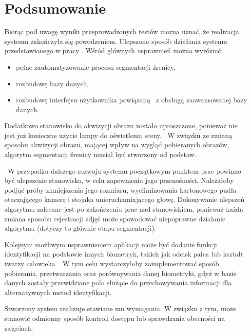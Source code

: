 \chapter{Podsumowanie}
\label{cha:podsumowanie}

Biorąc pod uwagę wyniki przeprowadzonych testów można uznać, że realizacja systemu zakończyła się powodzeniem. Ulepszono sposób działania systemu przedstawionego w pracy \cite{Gl11}. Wśród głównych usprawnień można wyróżnić:
\begin{itemize}
\item pełne zautomatyzowanie procesu segmentacji źrenicy,
\item rozbudowę bazy danych,
\item rozbudowę interfejsu użytkownika powiązaną ~z obsługą zaawansowanej bazy danych.
\end{itemize}

Dodatkowo stanowisko do akwizycji obrazu zostało uproszczone, ponieważ nie jest już konieczne użycie lampy do oświetlenia sceny. ~W związku ze zmianą sposobu akwizycji obrazu, mającej wpływ na wygląd pobieranych obrazów, algorytm segmentacji źrenicy musiał być stworzony od podstaw. 

~W przypadku dalszego rozwoju systemu początkowym punktem prac powinno być ulepszenie stanowiska, w celu zapewnienia jego przenośności. Należałoby podjąć próby zmniejszenia jego rozmiaru, wyeliminowania kartonowego pudła otaczającego kamerę i stojaka unieruchamiającego głowę. Dokonywanie ulepszeń algorytmu zalecane jest po zakończeniu prac nad stanowiskiem, ponieważ każda zmiana sposobu rejestracji zdjęć może spowodować niepoprawne działanie algorytmu (dotyczy to głównie etapu segmentacji).

Kolejnym możliwym usprawnieniem aplikacji może być dodanie funkcji identyfikacji na podstawie innych biometryk, takich jak odcisk palca lub kształt twarzy człowieka. ~W tym celu wystarczyłoby zaimplementować sposób pobierania, przetwarzania oraz porównywania danej biometryki, gdyż w bazie danych zostały przewidziane pola służące do przechowywania informacji dla alternatywnych metod identyfikacji.

Stworzony system realizuje stawiane mu wymagania. W związku z tym, może stanowić odmienny sposób kontroli dostępu lub sprawdzania obecności na zajęciach.
